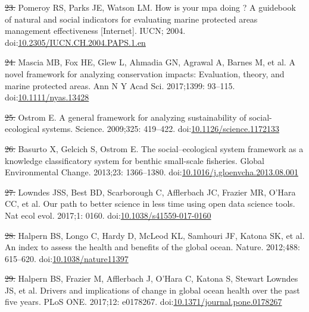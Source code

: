 \documentclass[12pt,]{article}
\providecommand{\DIFaddtex}[1]{{\protect\color{blue}\uwave{#1}}} %
\providecommand{\DIFdeltex}[1]{{\protect\color{red}\sout{#1}}}                      %
\providecommand{\DIFaddbegin}{} %
\providecommand{\DIFaddend}{} %
\providecommand{\DIFdelbegin}{} %
\providecommand{\DIFdelend}{} %
\providecommand{\DIFadd}[1]{\texorpdfstring{\DIFaddtex{#1}}{#1}} %
\providecommand{\DIFdel}[1]{\texorpdfstring{\DIFdeltex{#1}}{}} %
\newcommand{\DIFscaledelfig}{0.5}
\newlength{\DIFdelgraphicswidth} %
\newlength{\DIFdelgraphicsheight} %
\newcommand{\DIFaddincludegraphics}[2][]{{\color{blue}\fbox{\DIFOincludegraphics[#1]{#2}}}} %
\newcommand{\DIFdelincludegraphics}[2][]{%
\sbox{\DIFdelgraphicsbox}{\DIFOincludegraphics[#1]{#2}}%
\settoboxwidth{\DIFdelgraphicswidth}{\DIFdelgraphicsbox} %
\settoboxtotalheight{\DIFdelgraphicsheight}{\DIFdelgraphicsbox} %
\scalebox{\DIFscaledelfig}{%
\parbox[b]{\DIFdelgraphicswidth}{\usebox{\DIFdelgraphicsbox}\\[-\baselineskip] \rule{\DIFdelgraphicswidth}{0em}}\llap{\resizebox{\DIFdelgraphicswidth}{\DIFdelgraphicsheight}{%
\setlength{\unitlength}{\DIFdelgraphicswidth}%
\begin{picture}(1,1)%
\thicklines\linethickness{2pt} %
{\color[rgb]{1,0,0}\put(0,0){\framebox(1,1){}}}%
{\color[rgb]{1,0,0}\put(0,0){\line( 1,1){1}}}%
{\color[rgb]{1,0,0}\put(0,1){\line(1,-1){1}}}%
\end{picture}%
}\hspace*{3pt}}} %
} %
\DeclareRobustCommand{\DIFaddbegin}{\DIFOaddbegin \let\includegraphics\DIFaddincludegraphics} %
\DeclareRobustCommand{\DIFaddend}{\DIFOaddend \let\includegraphics\DIFOincludegraphics} %
\DeclareRobustCommand{\DIFdelbegin}{\DIFOdelbegin \let\includegraphics\DIFdelincludegraphics} %
\DeclareRobustCommand{\DIFdelend}{\DIFOaddend \let\includegraphics\DIFOincludegraphics} %
\begin{document}
\hypertarget{ref-pomeroy_2004-23}{}
\DIFdelbegin \DIFdel{23. }\DIFdelend \DIFaddbegin \DIFadd{24. }\DIFaddend Pomeroy RS, Parks JE, Watson LM. How is your mpa doing ? A guidebook
of natural and social indicators for evaluating marine protected areas
management effectiveness {[}Internet{]}. IUCN; 2004.
doi:\href{https://doi.org/10.2305/IUCN.CH.2004.PAPS.1.en}{10.2305/IUCN.CH.2004.PAPS.1.en}

\hypertarget{ref-mascia_2017-m_}{}
\DIFdelbegin \DIFdel{24. }\DIFdelend \DIFaddbegin \DIFadd{25. }\DIFaddend Mascia MB, Fox HE, Glew L, Ahmadia GN, Agrawal A, Barnes M, et al. A
novel framework for analyzing conservation impacts: Evaluation, theory,
and marine protected areas. Ann N Y Acad Sci. 2017;1399: 93--115.
doi:\href{https://doi.org/10.1111/nyas.13428}{10.1111/nyas.13428}

\hypertarget{ref-ostrom_2009-hg}{}
\DIFdelbegin \DIFdel{25. }\DIFdelend \DIFaddbegin \DIFadd{26. }\DIFaddend Ostrom E. A general framework for analyzing sustainability of
social-ecological systems. Science. 2009;325: 419--422.
doi:\href{https://doi.org/10.1126/science.1172133}{10.1126/science.1172133}

\hypertarget{ref-basurto_2013-oq}{}
\DIFdelbegin \DIFdel{26. }\DIFdelend \DIFaddbegin \DIFadd{27. }\DIFaddend Basurto X, Gelcich S, Ostrom E. The social--ecological system
framework as a knowledge classificatory system for benthic small-scale
fisheries. Global Environmental Change. 2013;23: 1366--1380.
doi:\href{https://doi.org/10.1016/j.gloenvcha.2013.08.001}{10.1016/j.gloenvcha.2013.08.001}

\hypertarget{ref-lowndes_2017-xh}{}
\DIFdelbegin \DIFdel{27. }\DIFdelend \DIFaddbegin \DIFadd{28. }\DIFaddend Lowndes JSS, Best BD, Scarborough C, Afflerbach JC, Frazier MR,
O'Hara CC, et al. Our path to better science in less time using open
data science tools. Nat ecol evol. 2017;1: 0160.
doi:\href{https://doi.org/10.1038/s41559-017-0160}{10.1038/s41559-017-0160}

\hypertarget{ref-halpern_2012-k9}{}
\DIFdelbegin \DIFdel{28. }\DIFdelend \DIFaddbegin \DIFadd{29. }\DIFaddend Halpern BS, Longo C, Hardy D, McLeod KL, Samhouri JF, Katona SK, et
al. An index to assess the health and benefits of the global ocean.
Nature. 2012;488: 615--620.
doi:\href{https://doi.org/10.1038/nature11397}{10.1038/nature11397}

\hypertarget{ref-halpern_2017-Zi}{}
\DIFdelbegin \DIFdel{29. }\DIFdelend \DIFaddbegin \DIFadd{30. }\DIFaddend Halpern BS, Frazier M, Afflerbach J, O'Hara C, Katona S, Stewart
Lowndes JS, et al. Drivers and implications of change in global ocean
health over the past five years. PLoS ONE. 2017;12: e0178267.
doi:\href{https://doi.org/10.1371/journal.pone.0178267}{10.1371/journal.pone.0178267}
\end{document}
